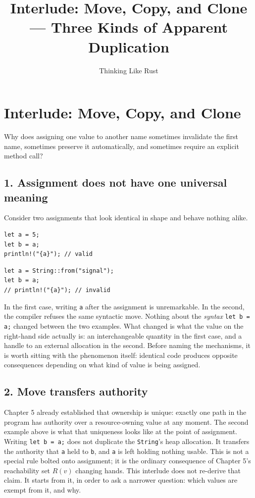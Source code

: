 \documentclass[11pt]{book}
\title{Interlude: Move, Copy, and Clone --- Three Kinds of Apparent Duplication}
\author{Thinking Like Rust}
\date{}
\begin{document}
\chapter*{Interlude: Move, Copy, and Clone}

\begin{firstprinciples}
Why does assigning one value to another name sometimes invalidate the first name, sometimes preserve it automatically, and sometimes require an explicit method call?
\end{firstprinciples}

\section*{1. Assignment does not have one universal meaning}

Consider two assignments that look identical in shape and behave nothing alike.

\begin{lstlisting}
let a = 5;
let b = a;
println!("{a}"); // valid
\end{lstlisting}

\begin{lstlisting}
let a = String::from("signal");
let b = a;
// println!("{a}"); // invalid
\end{lstlisting}

In the first case, writing \texttt{a} after the assignment is unremarkable. In the second, the compiler refuses the same syntactic move. Nothing about the \emph{syntax} \texttt{let b = a;} changed between the two examples. What changed is what the value on the right-hand side actually is: an interchangeable quantity in the first case, and a handle to an external allocation in the second. Before naming the mechanisms, it is worth sitting with the phenomenon itself: identical code produces opposite consequences depending on what kind of value is being assigned.

\section*{2. Move transfers authority}

Chapter 5 already established that ownership is unique: exactly one path in the program has authority over a resource-owning value at any moment. The second example above is what that uniqueness looks like at the point of assignment. Writing \texttt{let b = a;} does not duplicate the \texttt{String}'s heap allocation. It transfers the authority that \texttt{a} held to \texttt{b}, and \texttt{a} is left holding nothing usable. This is not a special rule bolted onto assignment; it is the ordinary consequence of Chapter 5's reachability set $R(v)$ changing hands. This interlude does not re-derive that claim. It starts from it, in order to ask a narrower question: which values are exempt from it, and why.
\end{document}
